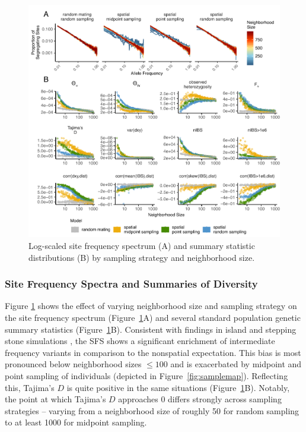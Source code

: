 \documentclass[10pt,twoside,lineno,hidelinks]{preprint}
\begin{document}
\begin{figure}[p]
\centering
\includegraphics[width=\textwidth]{figures/sfs_w_sumstats_loglog.pdf}
\caption{Log-scaled site frequency spectrum (A) and summary statistic distributions (B) by sampling strategy and neighborhood size.}
\label{fig:sumstats}
\end{figure}


\subsubsection{Site Frequency Spectra and Summaries of Diversity}

Figure \ref{fig:sumstats} shows the effect of varying neighborhood size and sampling strategy on the site frequency spectrum (Figure~\ref{fig:sumstats}A) and several standard population genetic summary statistics (Figure~\ref{fig:sumstats}B). Consistent with findings in island and stepping stone simulations \citep{Stadler2009}, the SFS shows a significant enrichment of intermediate frequency variants in comparison to the nonspatial expectation. This bias is most pronounced below neighborhood sizes $\leq 100$ and is exacerbated by midpoint and point sampling of individuals (depicted in Figure~\ref{fig:samplemap}). 
Reflecting this, Tajima's $D$ is quite positive in the same situations (Figure~\ref{fig:sumstats}B). Notably, the point at which Tajima's $D$ approaches 0 differs strongly across sampling strategies -- varying from a neighborhood size of roughly 50 for random sampling to at least 1000 for midpoint sampling. 
\end{document}
